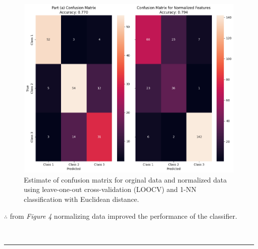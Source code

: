 \documentclass{article}
\begin{document}
\begin{figure}[H]

\includegraphics[width=15cm, height=9cm]{q10_c.png} 
\caption{Estimate of confusion matrix for orginal data and normalized data using leave-one-out cross-validation (LOOCV) and 1-NN classification with Euclidean distance.}

\end{figure}

\parbox{\textwidth}{$\therefore$ from \textit{Figure 4} normalizing data improved the performance of the classifier.}\\

\noindent\rule{\textwidth}{0.4pt}\\
\end{document}
